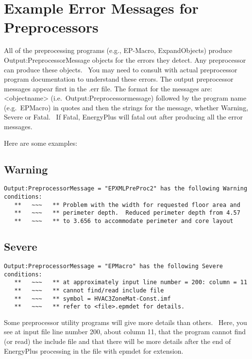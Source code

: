 \section{Example Error Messages for Preprocessors}\label{example-error-messages-for-preprocessors}

All of the preprocessing programs (e.g., EP-Macro, ExpandObjects) produce Output:PreprocessorMessage objects for the errors they detect. Any preprocessor can produce these objects.~ You may need to consult with actual preprocessor program documentation to understand these errors. The output preprocessor messages appear first in the .err file. The format for the messages are: \textless{}objectname\textgreater{} (i.e.~Output:Preprocessormessage) followed by the program name (e.g.~EPMacro) in quotes and then the strings for the message, whether Warning, Severe or Fatal.~ If Fatal, EnergyPlus will fatal out after producing all the error messages.

Here are some examples:

\subsection{Warning}\label{warning-000}

\begin{lstlisting}
Output:PreprocessorMessage = "EPXMLPreProc2" has the following Warning conditions:
   **   ~~~   ** Problem with the width for requested floor area and
   **   ~~~   ** perimeter depth.  Reduced perimeter depth from 4.57
   **   ~~~   ** to 3.656 to accommodate perimeter and core layout
\end{lstlisting}

\subsection{Severe}\label{severe-000}

\begin{lstlisting}
Output:PreprocessorMessage = "EPMacro" has the following Severe conditions:
   **   ~~~   ** at approximately input line number = 200: column = 11
   **   ~~~   ** cannot find/read include file
   **   ~~~   ** symbol = HVAC3ZoneMat-Const.imf
   **   ~~~   ** refer to <file>.epmdet for details.
\end{lstlisting}

Some preprocessor utility programs will give more details than others.~ Here, you see at input file line number 200, about column 11, that the program cannot find (or read) the include file and that there will be more details after the end of EnergyPlus processing in the file with epmdet for extension.

